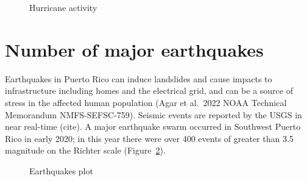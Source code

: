 \documentclass[
  letterpaper,
  oneside,
  open=any]{scrbook}
\begin{document}
\begin{figure}


\caption{\label{fig-ACE}Hurricane activity}

\end{figure}%

\section{Number of major earthquakes}\label{number-of-major-earthquakes}

Earthquakes in Puerto Rico can induce landslides and cause impacts to
infrastructure including homes and the electrical grid, and can be a
source of stress in the affected human population (Agar et al.~2022 NOAA
Technical Memorandum NMFS-SEFSC-759). Seismic events are reported by the
USGS in near real-time (cite). A major earthquake swarm occurred in
Southwest Puerto Rico in early 2020; in this year there were over 400
events of greater than 3.5 magnitude on the Richter scale
(Figure~\ref{fig-quakes}).

\begin{figure}


\caption{\label{fig-quakes}Earthquakes plot}

\end{figure}%
\end{document}
